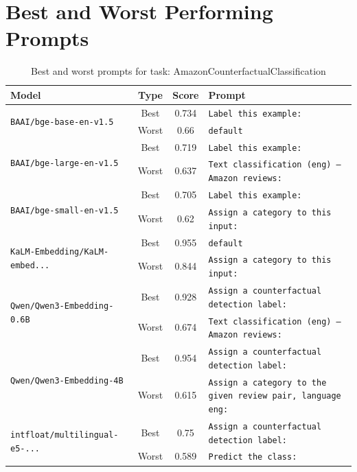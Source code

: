 \appendix
\section{Best and Worst Performing Prompts}

\begin{table}[t]
\centering
\small
\caption{Best and worst prompts for task: AmazonCounterfactualClassification}
\begin{tabular}{|p{}|c|c|p{}|}
\hline
Model & Type & Score & Prompt \\
\hline
\multirow{2}{=}{\raggedright\texttt{BAAI/\allowbreak bge-\allowbreak base-\allowbreak en-\allowbreak v1.5}} & Best & 0.734 & \texttt{Label this example:} \\
\cline{2-4}
& Worst & 0.66 & \texttt{default} \\
\hline
\multirow{2}{=}{\raggedright\texttt{BAAI/\allowbreak bge-\allowbreak large-\allowbreak en-\allowbreak v1.5}} & Best & 0.719 & \texttt{Label this example:} \\
\cline{2-4}
& Worst & 0.637 & \texttt{Text classification (eng) – Amazon reviews:} \\
\hline
\multirow{2}{=}{\raggedright\texttt{BAAI/\allowbreak bge-\allowbreak small-\allowbreak en-\allowbreak v1.5}} & Best & 0.705 & \texttt{Label this example:} \\
\cline{2-4}
& Worst & 0.62 & \texttt{Assign a category to this input:} \\
\hline
\multirow{2}{=}{\raggedright\texttt{KaLM-\allowbreak Embedding/\allowbreak KaLM-\allowbreak embed...}} & Best & 0.955 & \texttt{default} \\
\cline{2-4}
& Worst & 0.844 & \texttt{Assign a category to this input:} \\
\hline
\multirow{2}{=}{\raggedright\texttt{Qwen/\allowbreak Qwen3-\allowbreak Embedding-\allowbreak 0.6B}} & Best & 0.928 & \texttt{Assign a counterfactual detection label:} \\
\cline{2-4}
& Worst & 0.674 & \texttt{Text classification (eng) – Amazon reviews:} \\
\hline
\multirow{2}{=}{\raggedright\texttt{Qwen/\allowbreak Qwen3-\allowbreak Embedding-\allowbreak 4B}} & Best & 0.954 & \texttt{Assign a counterfactual detection label:} \\
\cline{2-4}
& Worst & 0.615 & \texttt{Assign a category to the given review pair, language eng:} \\
\hline
\multirow{2}{=}{\raggedright\texttt{intfloat/\allowbreak multilingual-\allowbreak e5-\allowbreak ...}} & Best & 0.75 & \texttt{Assign a counterfactual detection label:} \\
\cline{2-4}
& Worst & 0.589 & \texttt{Predict the class:} \\
\hline
\end{tabular}
\end{table}

